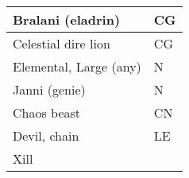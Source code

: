 \begin{longtable}{llll}
{\begin{minipage}[t]{3.326in}
Bralani (eladrin)\end{minipage}} & \multicolumn{3}{p{0.601in}|}{\begin{minipage}[t]{0.601in}\raggedright
CG\end{minipage}}\\
\hline
\multicolumn{1}{|p{3.326in}|}{\begin{minipage}[t]{3.326in}\raggedright
Celestial dire lion\end{minipage}} & \multicolumn{3}{p{0.601in}|}{\begin{minipage}[t]{0.601in}\raggedright
CG\end{minipage}}\\
\hline
\multicolumn{1}{|p{3.326in}|}{\begin{minipage}[t]{3.326in}\raggedright
Elemental, Large (any)\end{minipage}} & \multicolumn{3}{p{0.601in}|}{\begin{minipage}[t]{0.601in}\raggedright
N\end{minipage}}\\
\hline
\multicolumn{1}{|p{3.326in}|}{\begin{minipage}[t]{3.326in}\raggedright
Janni (genie)\end{minipage}} & \multicolumn{3}{p{0.601in}|}{\begin{minipage}[t]{0.601in}\raggedright
N\end{minipage}}\\
\hline
\multicolumn{1}{|p{3.326in}|}{\begin{minipage}[t]{3.326in}\raggedright
Chaos beast\end{minipage}} & \multicolumn{3}{p{0.601in}|}{\begin{minipage}[t]{0.601in}\raggedright
CN\end{minipage}}\\
\hline
\multicolumn{1}{|p{3.326in}|}{\begin{minipage}[t]{3.326in}\raggedright
Devil, chain\end{minipage}} & \multicolumn{3}{p{0.601in}|}{\begin{minipage}[t]{0.601in}\raggedright
LE\end{minipage}}\\
\hline
\multicolumn{1}{|p{3.326in}|}{\begin{minipage}[t]{3.326in}\raggedright
Xill\end{minipage}} & \multicolumn{3}{p{0.601in}|}{\begin{minipage}[t]{0.601in}\raggedright

\end{minipage}}
\end{longtable}
